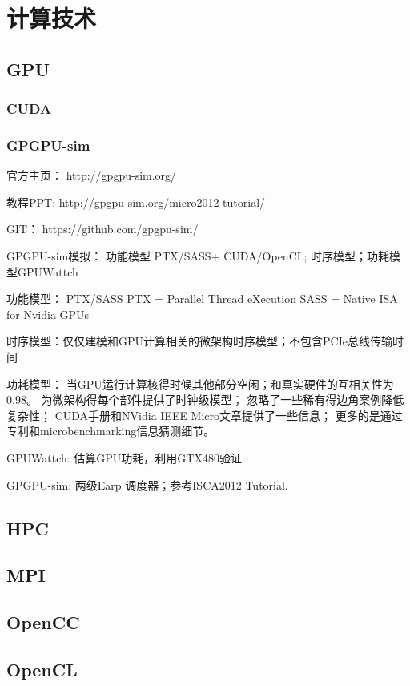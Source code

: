 \chapter{计算技术}


\section{GPU}

\subsection{CUDA}


\subsection{GPGPU-sim}

官方主页：  http://gpgpu-sim.org/

教程PPT:  http://gpgpu-sim.org/micro2012-tutorial/

GIT：   https://github.com/gpgpu-sim/


GPGPU-sim模拟： 功能模型 PTX/SASS+ CUDA/OpenCL; 时序模型；功耗模型GPUWattch

功能模型： PTX/SASS
PTX = Parallel Thread eXecution
SASS = Native ISA for Nvidia GPUs

时序模型：仅仅建模和GPU计算相关的微架构时序模型；不包含PCIe总线传输时间

功耗模型： 当GPU运行计算核得时候其他部分空闲；和真实硬件的互相关性为0.98。
为微架构得每个部件提供了时钟级模型；
忽略了一些稀有得边角案例降低复杂性；
CUDA手册和NVidia IEEE Micro文章提供了一些信息； 更多的是通过专利和microbenchmarking信息猜测细节。


GPUWattch: 估算GPU功耗，利用GTX480验证


GPGPU-sim: 两级Earp 调度器；参考ISCA2012 Tutorial.


\section{HPC}


\section{MPI}



\section{OpenCC}

\section{OpenCL}